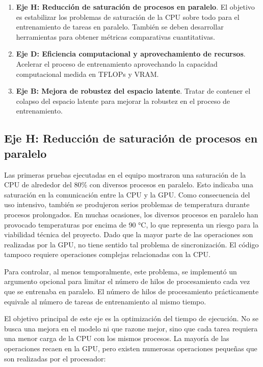 \documentclass[11pt,a4paper,spanish]{book}
\numberwithin{equation}{chapter}
\numberwithin{figure}{chapter}
\begin{document}
\begin{enumerate}
	\item \textbf{Eje H: Reducción de saturación de procesos en paralelo}. El objetivo es estabilizar los problemas de saturación de la CPU sobre todo 
	para el entrenamiento de tareas en paralelo. También se deben desarrollar herramientas para obtener métricas comparativas cuantitativas.
	\item \textbf{Eje D: Eficiencia computacional y aprovechamiento de recursos}. Acelerar el proceso de entrenamiento aprovechando la capacidad
	computacional medida en TFLOPs y VRAM.
	\item \textbf{Eje B: Mejora de robustez del espacio latente}. Tratar de contener el colapso del espacio latente para mejorar la robustez en el proceso de entrenamiento.
\end{enumerate}

\subsection{Eje H: Reducción de saturación de procesos en paralelo}

Las primeras pruebas ejecutadas en el equipo mostraron una saturación de la CPU de alrededor del 80\% con diversos procesos en paralelo. Esto
indicaba una saturación en la comunicación entre la CPU y la GPU. Como consecuencia del uso intensivo, también se produjeron serios problemas
de temperatura durante procesos prolongados. En muchas ocasiones, los diversos procesos en paralelo
han provocado temperaturas por encima de 90 °C, lo que representa un riesgo para la viabilidad técnica del proyecto. Dado que la mayor parte de las operaciones son realizadas por la GPU, no tiene sentido
tal problema de sincronización. El código tampoco requiere operaciones complejas relacionadas con la CPU.

Para controlar, al menos temporalmente, este problema, se implementó un argumento opcional para limitar el número de hilos de procesamiento
cada vez que se entrenaba en paralelo. El número de hilos de procesamiento prácticamente equivale al número de tareas de entrenamiento al mismo tiempo.

El objetivo principal de este eje es la optimización del tiempo de ejecución. No se busca una mejora en el modelo
ni que razone mejor, sino que cada tarea requiera una menor carga de la CPU con los mismos procesos. La mayoría de las
operaciones recaen en la GPU, pero existen numerosas operaciones pequeñas que son realizadas por el procesador:
\end{document}
